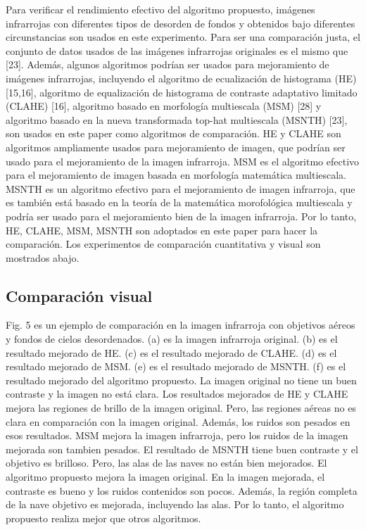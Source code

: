 \documentclass[a4paper, 11 pt, conference]{ieeeconf}      %
\begin{document}
Para verificar el rendimiento efectivo del algoritmo propuesto, im\'agenes infrarrojas con diferentes tipos de desorden de fondos y obtenidos bajo diferentes circunstancias son usados en este experimento. Para ser una comparaci\'on justa, el conjunto de datos usados de las im\'agenes infrarrojas originales es el mismo que [23]. Adem\'as, algunos algoritmos podr\'ian ser usados para mejoramiento de im\'agenes infrarrojas, incluyendo el algoritmo de ecualizaci\'on de histograma (HE)[15,16], algoritmo de equalizaci\'on  de histograma de contraste adaptativo limitado (CLAHE) [16], algoritmo basado en morfolog\'ia multiescala (MSM) [28] y algoritmo basado en la nueva transformada top-hat multiescala (MSNTH) [23], son usados en este paper como algoritmos de comparaci\'on. HE y CLAHE son algoritmos ampliamente usados para mejoramiento de imagen, que podr\'ian ser usado para el mejoramiento de la imagen infrarroja. MSM es el algoritmo efectivo para el mejoramiento de imagen basada en morfolog\'ia matem\'atica multiescala. MSNTH es un algoritmo efectivo para el mejoramiento de imagen infrarroja, que es tambi\'en est\'a basado en la teor\'ia de la matem\'atica morofol\'ogica multiescala y podr\'ia ser usado para el mejoramiento bien de la imagen infrarroja. Por lo tanto, HE, CLAHE, MSM, MSNTH son adoptados en este paper para hacer la comparaci\'on. Los experimentos de comparaci\'on cuantitativa y visual son mostrados abajo.

\subsection{Comparaci\'on visual}

Fig. 5 es un ejemplo de comparaci\'on en la imagen infrarroja con objetivos a\'ereos y fondos de cielos desordenados. (a) es la imagen infrarroja original. (b) es el resultado mejorado de HE. (c) es el resultado mejorado de CLAHE. (d) es el resultado mejorado de MSM. (e) es el resultado mejorado de MSNTH. (f) es el resultado mejorado del algoritmo propuesto. La imagen original no tiene un buen contraste y la imagen no est\'a clara. Los resultados mejorados de HE y CLAHE mejora las regiones de brillo de la imagen original. Pero, las regiones a\'ereas no es clara en comparaci\'on con la imagen original. Adem\'as, los ruidos son pesados en esos resultados. MSM mejora la imagen infrarroja, pero los ruidos de la imagen mejorada son tambien pesados. El resultado de MSNTH tiene buen  contraste y el objetivo es brilloso. Pero, las alas de las naves no est\'an bien mejorados. El algoritmo propuesto mejora la imagen original. En la imagen mejorada, el contraste es bueno y los ruidos contenidos son pocos. Adem\'as, la regi\'on completa de la nave objetivo es mejorada, incluyendo las alas. Por lo tanto, el algoritmo propuesto realiza mejor que otros algoritmos.
\end{document}
